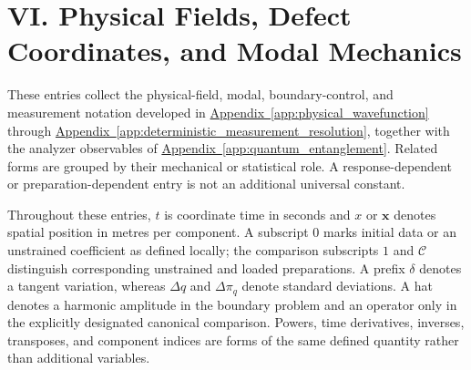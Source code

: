 \newpage
\section*{VI. Physical Fields, Defect Coordinates, and Modal Mechanics}

These entries collect the physical-field, modal, boundary-control, and measurement notation developed in
\hyperref[app:physical_wavefunction]{Appendix~\ref*{app:physical_wavefunction}} through
\hyperref[app:deterministic_measurement_resolution]{Appendix~\ref*{app:deterministic_measurement_resolution}},
together with the analyzer observables of
\hyperref[app:quantum_entanglement]{Appendix~\ref*{app:quantum_entanglement}}. Related forms are grouped
by their mechanical or statistical role. A response-dependent or
preparation-dependent entry is not an additional universal constant.

Throughout these entries, $t$ is coordinate time in seconds and $x$ or
$\mathbf x$ denotes spatial position in metres per component. A subscript
$0$ marks initial data or an unstrained coefficient as defined locally;
the comparison subscripts $1$ and $\mathcal C$ distinguish corresponding
unstrained and loaded preparations. A prefix $\delta$ denotes a tangent
variation, whereas $\Delta q$ and $\Delta\pi_q$ denote standard deviations.
A hat denotes a harmonic amplitude in the boundary problem and an
operator only in the explicitly designated canonical comparison.
Powers, time derivatives, inverses, transposes, and component indices
are forms of the same defined quantity rather than additional variables.

